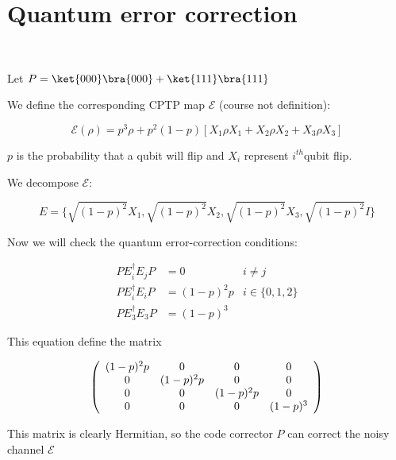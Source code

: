 
\section{Quantum error correction}

~

Let $P = \ket{000}\bra{000} + \ket{111}\bra{111}$

We define the corresponding CPTP map $\mathcal E$ (course not definition):

$$\mathcal E(\rho) = p^3\rho + p^2(1-p)[X_1\rho X_1 + X_2\rho X_2 + X_3\rho X_3]$$

$p$ is the probability that a qubit will flip and $X_i$ represent
$i^{th}$qubit flip.

We decompose $\mathcal E$:

$$E = \{\sqrt{(1-p)^2}X_1, \sqrt{(1-p)^2}X_2, \sqrt{(1-p)^2}X_3, \sqrt{(1-p)^2}I\}$$

Now we will check the quantum error-correction conditions:

\begin{align*}
  PE_i^\dagger E_j P &= 0 & i\not = j \\
  PE_i^\dagger E_i P &= (1-p)^2p & i \in \{0, 1, 2\} \\
  PE_3^\dagger E_3 P &= (1-p)^3
\end{align*}

This equation define the matrix

\begin{align*}
  \left(
  \begin{array}{c c c c}
  (1-p)^2p & 0 & 0 & 0 \\
  0 &(1-p)^2p & 0 & 0 \\
  0 & 0 & (1-p)^2p & 0 \\
  0 & 0 & 0 &(1-p)^3  \\
  \end{array}
  \right)
\end{align*}

This matrix is clearly Hermitian, so the code corrector $P$ can correct the
noisy channel $\mathcal E$
